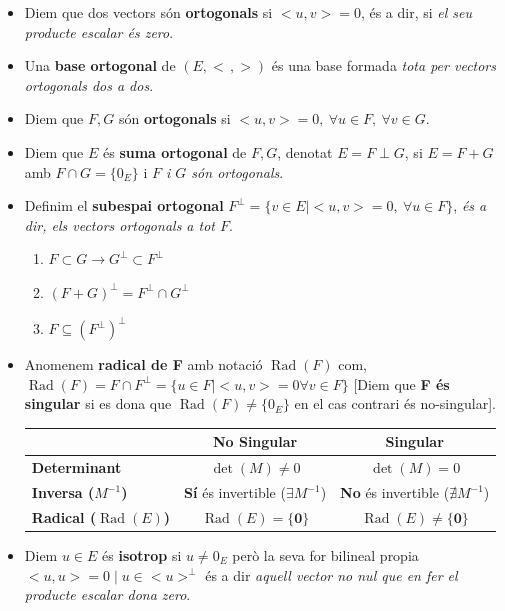 \documentclass[12pt]{article}
\begin{document}
\begin{itemize}
    \item Diem que dos vectors són \textbf{ortogonals} si $< u,v> = 0$, és a dir, si \textit{el seu producte escalar és zero}.
    \item Una \textbf{base ortogonal} de $(E,<\,,>)$ és una base formada \textit{tota per vectors ortogonals dos a dos}.
    \item Diem que $F,G$ són \textbf{ortogonals} si \textit{$< u,v> = 0,\ \forall u \in F,\ \forall v \in G$}.
    \item Diem que $E$ és \textbf{suma ortogonal} de $F,G$, denotat $E = F\perp G$, si $E = F+G$ amb $F\cap G = \{0_E\}$ i \textit{$F$ i $G$ són ortogonals}.
    \item Definim el \textbf{subespai ortogonal} $F^{\perp} = \{v\in E \mid < u,v> = 0,\ \forall u \in F \}$, \textit{és a dir, els vectors ortogonals a tot $F$}.
        \begin{enumerate}
            \item $F\subset G \rightarrow G^{\perp} \subset F^{\perp}$
            \item $(F+G)^{\perp} = F^{\perp} \cap G^{\perp}$
            \item $F \subseteq (F^{\perp})^{\perp}$
        \end{enumerate}
    \item Anomenem \textbf{radical de F} amb notació $\operatorname{Rad}(F)$ com, $\operatorname{Rad}(F) = F \cap F^{\perp} = \{u\in F \mid < u,v> = 0 \forall v \in F\}$ [Diem que \textbf{F és singular} si es dona que $\operatorname{Rad}(F) \neq \{0_E\}$ en el cas contrari és no-singular].
    \begin{table}[h!]
        \centering
        \renewcommand{\arraystretch}{1.4}
        \begin{tabular}{|l|c|c|}
        \hline
        & \textbf{No Singular} & \textbf{Singular } \\ \hline
        \textbf{Determinant} & $\det(M) \neq 0$ & $\det(M) = 0$ \\ \hline
        \textbf{Inversa ($M^{-1}$)} & \textbf{Sí} és invertible ($\exists M^{-1}$) & \textbf{No} és invertible ($\nexists M^{-1}$) \\ \hline
        \textbf{Radical ($\operatorname{Rad}(E)$)} &  $\operatorname{Rad}(E) = \{\mathbf{0}\}$ &  $\operatorname{Rad}(E) \neq \{\mathbf{0}\}$ \\ \hline
    \end{tabular}
    \end{table}

    \item Diem $u\in E$ és \textbf{isotrop} si $u \neq 0_E$ però la seva for bilineal propia $< u,u> = 0 \mid u \in <u>^{\perp}$ és a dir \textit{aquell vector no nul que en fer el producte escalar dona zero}.
\end{itemize}
\end{document}
